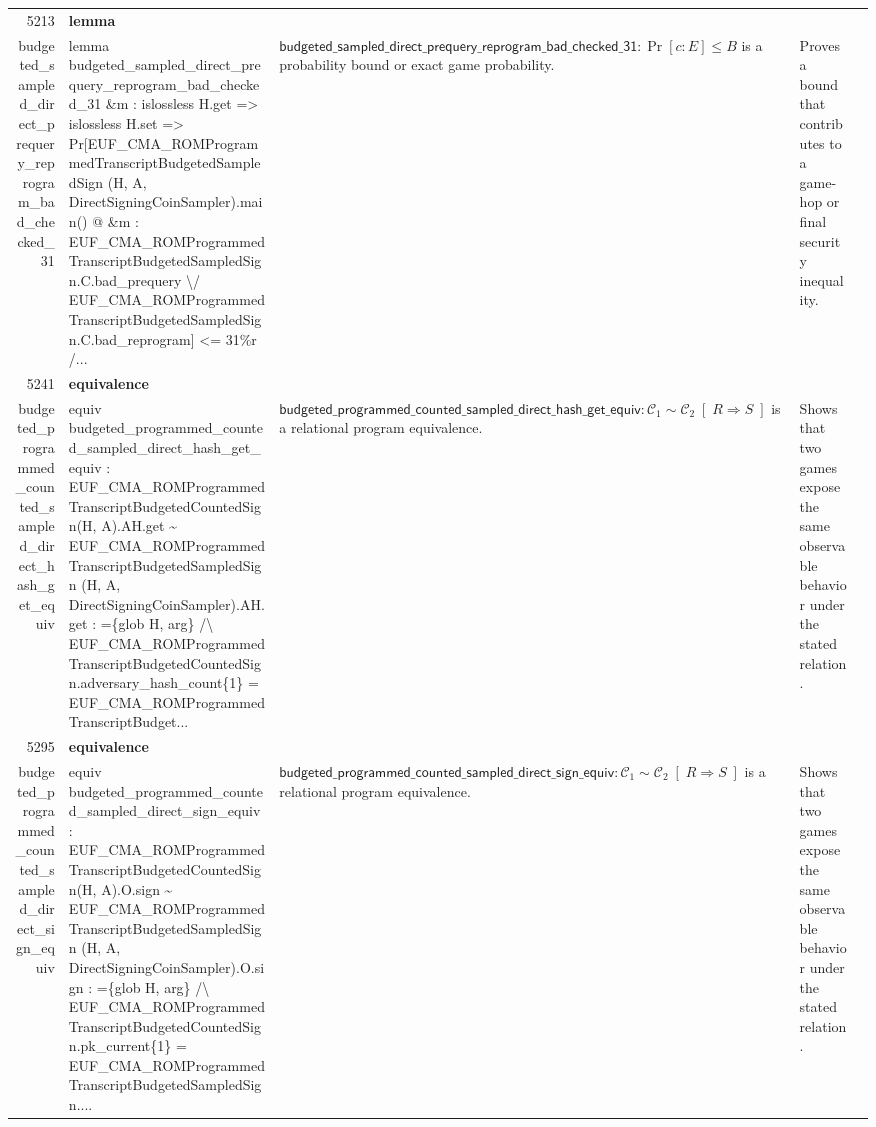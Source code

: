 \documentclass[10pt]{article}
\newcommand{\ec}[1]{\begingroup\ttfamily\scriptsize #1\endgroup}
\begin{document}
\begin{longtable}{r L{0.17\textwidth} L{0.26\textwidth} L{0.27\textwidth} L{0.20\textwidth}}
5213 & \textbf{lemma}\\\ec{budgeted\_sampled\_direct\_prequery\_reprogram\_bad\_checked\_31} & \ec{lemma budgeted\_sampled\_direct\_prequery\_reprogram\_bad\_checked\_31 \&m : islossless H.get => islossless H.set => Pr[EUF\_CMA\_ROMProgrammedTranscriptBudgetedSampledSign (H, A, DirectSigningCoinSampler).main() @ \&m : EUF\_CMA\_ROMProgrammedTranscriptBudgetedSampledSign.C.bad\_prequery \textbackslash{}/ EUF\_CMA\_ROMProgrammedTranscriptBudgetedSampledSign.C.bad\_reprogram] <= 31\%r /...} & \(\mathsf{budgeted\_sampled\_direct\_prequery\_reprogram\_bad\_checked\_31} : \Pr[c : E] \le B\) is a probability bound or exact game probability. & Proves a bound that contributes to a game-hop or final security inequality. \\
5241 & \textbf{equivalence}\\\ec{budgeted\_programmed\_counted\_sampled\_direct\_hash\_get\_equiv} & \ec{equiv budgeted\_programmed\_counted\_sampled\_direct\_hash\_get\_equiv : EUF\_CMA\_ROMProgrammedTranscriptBudgetedCountedSign(H, A).AH.get \textasciitilde{} EUF\_CMA\_ROMProgrammedTranscriptBudgetedSampledSign (H, A, DirectSigningCoinSampler).AH.get : =\{glob H, arg\} /\textbackslash{} EUF\_CMA\_ROMProgrammedTranscriptBudgetedCountedSign.adversary\_hash\_count\{1\} = EUF\_CMA\_ROMProgrammedTranscriptBudget...} & \(\mathsf{budgeted\_programmed\_counted\_sampled\_direct\_hash\_get\_equiv} : \mathcal{C}_1 \sim \mathcal{C}_2 \;[\;R \Rightarrow S\;]\) is a relational program equivalence. & Shows that two games expose the same observable behavior under the stated relation. \\
5295 & \textbf{equivalence}\\\ec{budgeted\_programmed\_counted\_sampled\_direct\_sign\_equiv} & \ec{equiv budgeted\_programmed\_counted\_sampled\_direct\_sign\_equiv : EUF\_CMA\_ROMProgrammedTranscriptBudgetedCountedSign(H, A).O.sign \textasciitilde{} EUF\_CMA\_ROMProgrammedTranscriptBudgetedSampledSign (H, A, DirectSigningCoinSampler).O.sign : =\{glob H, arg\} /\textbackslash{} EUF\_CMA\_ROMProgrammedTranscriptBudgetedCountedSign.pk\_current\{1\} = EUF\_CMA\_ROMProgrammedTranscriptBudgetedSampledSign....} & \(\mathsf{budgeted\_programmed\_counted\_sampled\_direct\_sign\_equiv} : \mathcal{C}_1 \sim \mathcal{C}_2 \;[\;R \Rightarrow S\;]\) is a relational program equivalence. & Shows that two games expose the same observable behavior under the stated relation. \\

\end{longtable}
\end{document}
